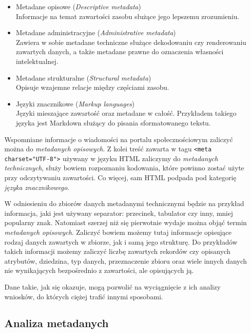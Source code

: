 	\begin{itemize}
		\item Metadane opisowe (\emph{Descriptive metadata}) \\
		Informacje na temat zawartości zasobu służące jego lepszemu zrozumieniu.

		\item Metadane administracyjne (\emph{Administrative metadata}) \\
		Zawiera w sobie metadane techniczne służące dekodowaniu czy renderowaniu zawartych danych, a także metadane prawne do oznaczenia własności intelektualnej.

		\item Metadane strukturalne (\emph{Structural metadata}) \\
		Opisuje wzajemne relacje między częściami zasobu.

		\item Języki znacznikowe (\emph{Markup languages}) \\
		Języki mieszające zawartość oraz metadane w całość.
		Przykładem takiego języka jest Markdown służący do pisania sformatowanego tekstu.
	\end{itemize}

	Wspomniane informacje o wiadomości na portalu społecznościowym zaliczyć można do \emph{metadanych opisowych}.
	Z kolei treść zawarta w tagu \lstinline{<meta charset="UTF-8">} używany w języku HTML zaliczymy do \emph{metadanych technicznych}, służy bowiem rozpoznaniu kodowania, które powinno zostać użyte przy odczytywaniu zawartości.
	Co więcej, sam HTML podpada pod kategorię \emph{języka znacznikowego}.

	W odniesieniu do zbiorów danych metadanymi technicznymi będzie na przykład informacja, jaki jest używany separator: przecinek, tabulator czy inny, mniej popularny znak.
	Natomiast szerzej niż się pierwotnie wydaje można objąć termin \emph{metadanych opisowych}.
	Zaliczyć bowiem możemy tutaj informacje opisujące rodzaj danych zawartych w zbiorze, jak i samą jego strukturę.
	Do przykładów takich informacji możemy zaliczyć liczbę zawartych rekordów czy opisanych atrybutów, dziedzina, typ danych, przeznaczenie zbioru oraz wiele innych danych nie wynikających bezpośrednio z zawartości, ale opisujących ją.

	Dane takie, jak się okazuje, mogą pozwolić na wyciągnięcie z ich analizy wniosków, do których ciężej trafić innymi sposobami.

	\subsection{Analiza metadanych}

